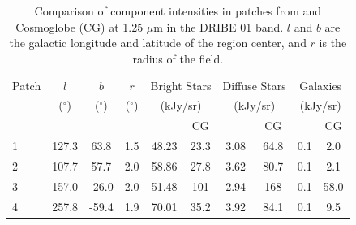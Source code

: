 \documentclass{aa}
\begin{document}
\begin{table}
    \centering
    \begin{tabular}{l c c c c c c c c c}
    \hline
    \hline
     Patch & $l$ & $b$ & $r$ & \multicolumn{2}{c}{Bright Stars} & \multicolumn{2}{c}{Diffuse Stars} & \multicolumn{2}{c}{Galaxies} \\ 
     & ($^{\circ}$) & ($^{\circ}$) & ($^{\circ}$) & \multicolumn{2}{c}{(kJy/sr)} & \multicolumn{2}{c}{(kJy/sr)} & \multicolumn{2}{c}{(kJy/sr)} \\
          &  & & & \cite{DIRBE2mass} & CG & \cite{DIRBE2mass} & CG & \cite{DIRBE2mass} & CG\\
    
     \hline
     1 \rule{0pt}{2ex} & 127.3 & 63.8  & 1.5 & 48.23 & 23.3 & 3.08 & 64.8 & 0.1 & 2.0\\
     2 & 107.7 & 57.7 & 2.0 & 58.86 & 27.8 & 3.62 & 80.7 & 0.1 & 2.1 \\
     3 & 157.0 & -26.0 & 2.0 & 51.48 & 101 & 2.94 & 168 & 0.1 & 58.0 \\
     4 & 257.8 & -59.4 & 1.9 & 70.01 & 35.2 & 3.92 & 84.1 & 0.1 & 9.5\\
     \hline
    \end{tabular}
    \caption{Comparison of component intensities in patches from \cite{DIRBE2mass} and Cosmoglobe (CG) at 1.25 $\mu$m in the DRIBE 01 band. $l$ and $b$ are the galactic longitude and latitude of the region center, and $r$ is the radius of the field.}
    \label{tab:2mass}
\end{table}
\end{document}
